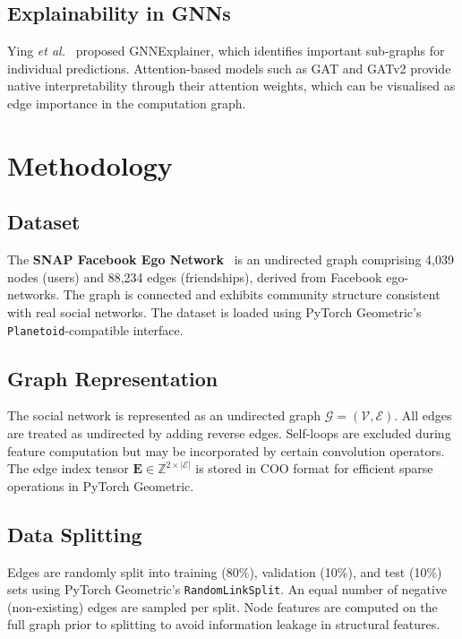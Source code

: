 \documentclass[12pt,a4paper]{article}
\begin{document}
\subsection{Explainability in GNNs}

Ying \textit{et al.}~\cite{ying2019} proposed GNNExplainer, which identifies important sub-graphs for individual predictions. Attention-based models such as GAT and GATv2 provide native interpretability through their attention weights, which can be visualised as edge importance in the computation graph.

\section{Methodology}
\label{sec:methodology}

\subsection{Dataset}

The \textbf{SNAP Facebook Ego Network}~\cite{leskovec2012} is an undirected graph comprising 4,039 nodes (users) and 88,234 edges (friendships), derived from Facebook ego-networks. The graph is connected and exhibits community structure consistent with real social networks. The dataset is loaded using PyTorch Geometric's \texttt{Planetoid}-compatible interface.

\subsection{Graph Representation}

The social network is represented as an undirected graph $\mathcal{G}=(\mathcal{V},\mathcal{E})$. All edges are treated as undirected by adding reverse edges. Self-loops are excluded during feature computation but may be incorporated by certain convolution operators. The edge index tensor $\mathbf{E} \in \mathbb{Z}^{2 \times |\mathcal{E}|}$ is stored in COO format for efficient sparse operations in PyTorch Geometric.

\subsection{Data Splitting}

Edges are randomly split into training (80\%), validation (10\%), and test (10\%) sets using PyTorch Geometric's \texttt{RandomLinkSplit}. An equal number of negative (non-existing) edges are sampled per split. Node features are computed on the full graph prior to splitting to avoid information leakage in structural features.
\end{document}

